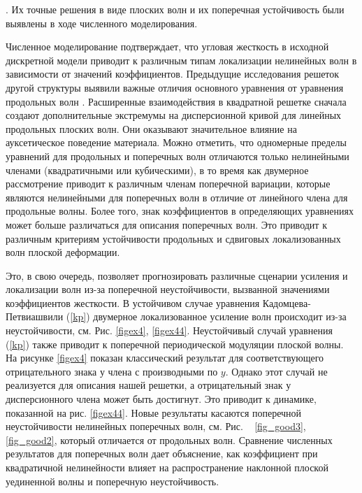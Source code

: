 . Их точные решения в виде плоских волн и их поперечная устойчивость были выявлены в ходе численного моделирования.

Численное моделирование подтверждает, что угловая жесткость в исходной дискретной модели приводит к различным типам локализации нелинейных волн в зависимости от значений коэффициентов. Предыдущие исследования решеток другой структуры выявили важные отличия основного уравнения от уравнения продольных волн \cite {porkros}.
Расширенные взаимодействия в квадратной решетке сначала создают дополнительные экстремумы на дисперсионной кривой для линейных продольных плоских волн. Они оказывают значительное влияние на ауксетическое поведение материала. Можно отметить, что одномерные пределы уравнений для продольных и поперечных волн отличаются только нелинейными членами (квадратичными или кубическими), в то время как двумерное рассмотрение приводит к различным членам поперечной вариации, которые являются нелинейными для поперечных волн в отличие от линейного члена для продольные волны. Более того, знак коэффициентов в определяющих уравнениях может больше различаться для описания поперечных волн. Это приводит к различным критериям устойчивости продольных и сдвиговых локализованных волн плоской деформации.

Это, в свою очередь, позволяет прогнозировать различные сценарии усиления и локализации волн из-за поперечной неустойчивости, вызванной значениями коэффициентов жесткости. В устойчивом случае уравнения Кадомцева-Петвиашвили (\ref {kp}) двумерное локализованное усиление волн происходит из-за неустойчивости, см. Рис. \ref {figex4}, \ref {figex44}. Неустойчивый случай уравнения (\ref {kp}) также приводит к поперечной периодической модуляции плоской волны. На рисунке \ref {figex4} показан классический результат для соответствующего отрицательного знака у члена с производными по $ y $. Однако этот случай не реализуется для описания нашей решетки, а отрицательный знак у дисперсионного члена может быть достигнут. Это приводит к динамике, показанной на рис. \ref{figex44}. Новые результаты касаются поперечной неустойчивости нелинейных поперечных волн, см. Рис. ~ \ref {fig_good3}, \ref{fig_good2}, который отличается от продольных волн. Сравнение численных результатов для поперечных волн дает объяснение, как коэффициент при квадратичной нелинейности влияет на распространение наклонной плоской уединенной волны и поперечную неустойчивость.
